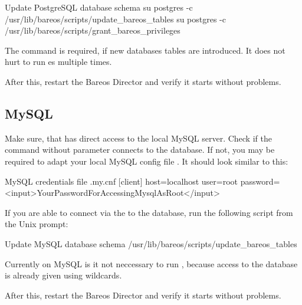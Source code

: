 \begin{commands}{Update PostgreSQL database schema}
su postgres -c /usr/lib/bareos/scripts/update_bareos_tables
su postgres -c /usr/lib/bareos/scripts/grant_bareos_privileges
\end{commands}

The  command is required, if new databases tables are introduced. It does not hurt to run es multiple times.

After this, restart the Bareos Director and verify it starts without problems.

\subsection{MySQL}
Make sure, that  has direct access to the local MySQL server.
Check if the command  without parameter connects to the database.
If not, you may be required to adapt your local MySQL config file .
It should look similar to this:

\begin{config}{MySQL credentials file .my.cnf}
[client]
host=localhost
user=root
password=<input>YourPasswordForAccessingMysqlAsRoot</input>
\end{config}

If you are able to connect via the  to the database, run the following script from the Unix prompt:
\begin{commands}{Update MySQL database schema}
/usr/lib/bareos/scripts/update_bareos_tables
\end{commands}

Currently on MySQL is it not neccessary to run , because access to the database is already given using wildcards.

After this, restart the Bareos Director and verify it starts without problems.
